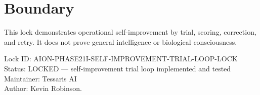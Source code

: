\documentclass[11pt,a4paper]{article}
\begin{document}
\section{Boundary}

This lock demonstrates operational self-improvement by trial, scoring, correction, and retry. It does not prove general intelligence or biological consciousness.

\bigskip

\noindent
Lock ID: AION-PHASE21I-SELF-IMPROVEMENT-TRIAL-LOOP-LOCK\\
Status: LOCKED --- self-improvement trial loop implemented and tested\\
Maintainer: Tessaris AI\\
Author: Kevin Robinson.
\end{document}
